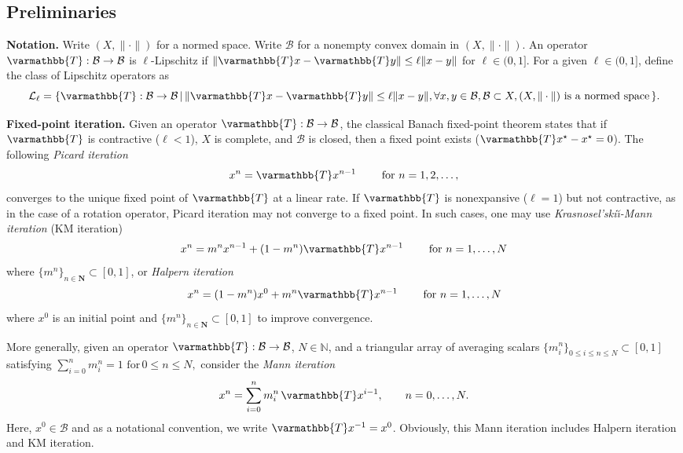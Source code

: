 \documentclass[pdflatex,sn-mathphys-num]{sn-jnl}%
\newcommand{\cB}{\mathcal{B}}
\newcommand{\cL}{\mathcal{L}}
\newcommand{\NN}{\mathbb{N}}
\newcommand{\opT}{{\varmathbb{T}}}
\theoremstyle{thmstyleone}%
\theoremstyle{thmstyletwo}%
\theoremstyle{thmstylethree}%
\begin{document}
\subsection{Preliminaries}
\noindent\textbf{Notation.} Write $(X, \|\cdot\|)$ for a normed space. Write $\cB$ for a nonempty convex domain in $(X, \|\cdot\|)$.
An operator $\opT:\cB\rightarrow\cB$ is $\ell$-Lipschitz if $\|\opT x-\opT y\| \le \ell\|x-y\| $  for $\ell \in (0,1]$. For a given $\ell \in (0,1]$, define the class of Lipschitz operators as 
\[\cL_\ell =\{\opT:\cB\rightarrow\cB \,|\, \|\opT x-\opT y\| \le \ell\|x-y\|,  \forall x,y \in \cB, \cB\subset X, (X, \|\cdot\|) \text{ is a normed space\,}\}.\] 


 \vspace{0.2in}

\noindent\textbf{Fixed-point iteration.}
Given an operator $\opT: \cB \rightarrow \cB$, the classical Banach fixed-point theorem \cite{banach1922operations} states that if $\opT$ is contractive ($\ell<1$), $X$ is complete, and $\cB$ is closed, then a fixed point exists ($\opT x^\star- x^\star=0$). The following \emph{Picard iteration}
\[x^{n}=\opT x^{n-1}\qquad\text{ for } n=1,2,\dots,\]
converges to the unique fixed point of $\opT$ at a linear rate. If $\opT$ is nonexpansive ($\ell=1$) but not contractive, as in the case of a rotation operator, Picard iteration may not converge to a fixed point. In such cases, one may use \emph{Krasnosel'ski\u\i-Mann iteration} \cite{Mann1953mean, krasnosel1955two} (KM iteration)
\[ x^{n}=m^n x^{n-1}+ (1-m^{n}) \opT x^{n-1}
\qquad\text{ for } n=1,\dots,N\]
where $\{m^n\}_{n \in \mathbf{N}} \subset [0,1]$, or \emph{Halpern iteration} \cite{halpern1967fixed}
\[ x^{n}= (1-m^n) x^0+ m^{n} \opT x^{n-1}
\qquad\text{ for } n=1,\dots, N\]
where $x^0$ is an initial point and $\{m^n\}_{n \in \mathbf{N}}  \subset  [0,1]$ to improve convergence.

More generally, given an operator $\opT: \cB \rightarrow \cB$, $N \in \NN$, and a triangular array of averaging scalars $\{m^n_i\}_{0\le i \le n \le N} \subset [0,1]$
satisfying $ \sum_{i=0}^{n}m_i^n=1 \text{ for} \, 0\le n\le N,$ 
consider the \emph{Mann iteration}
\[
x^n=\sum_{i=0}^n m_i^n\,\opT x^{i-1},
\qquad n=0,\dots,N.
\]
Here, $x^0\in\cB$ and as a notational convention, we write $\opT x^{-1}=x^0$. Obviously, this Mann iteration includes Halpern iteration and KM iteration.
\end{document}
